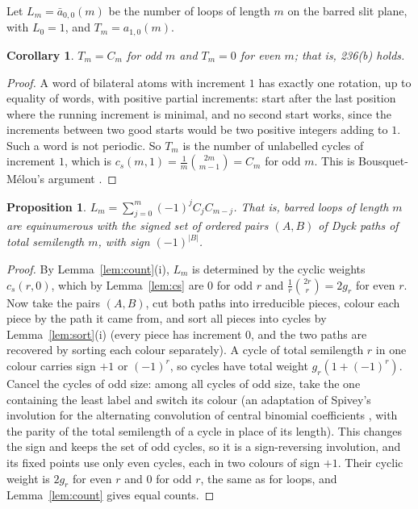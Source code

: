 \documentclass[11pt]{amsart}
\newtheorem{proposition}[theorem]{Proposition}
\newtheorem{corollary}[theorem]{Corollary}
\theoremstyle{definition}
\theoremstyle{remark}
\newcommand{\abar}{\bar a}
\begin{document}
Let $L_m=\abar_{0,0}(m)$ be the number of loops of length $m$ on the barred slit plane, with $L_0=1$, and $T_m=a_{1,0}(m)$.

\begin{corollary}\label{cor:T}
$T_m=C_m$ for odd $m$ and $T_m=0$ for even $m$; that is, 236(b) holds.
\end{corollary}

\begin{proof}
A word of bilateral atoms with increment $1$ has exactly one rotation, up to equality of words, with positive partial
increments: start after the last position where the running increment is minimal, and no second start works, since the
increments between two good starts would be two positive integers adding to $1$. Such a word is not periodic. So $T_m$
is the number of unlabelled cycles of increment $1$, which is $c_s(m,1)=\frac1m\binom{2m}{m-1}=C_m$ for odd $m$.
This is Bousquet-M\'elou's argument \cite[Prop.~2]{BM}.
\end{proof}

\begin{proposition}\label{prop:loops}
$L_m=\sum_{j=0}^m(-1)^jC_jC_{m-j}$. That is, barred loops of length $m$ are equinumerous with the signed set of
ordered pairs $(A,B)$ of Dyck paths of total semilength $m$, with sign $(-1)^{|B|}$.
\end{proposition}

\begin{proof}
By Lemma~\ref{lem:count}(i), $L_m$ is determined by the cyclic weights $c_s(r,0)$, which by Lemma~\ref{lem:cs} are
$0$ for odd $r$ and $\frac1r\binom{2r}r=2g_r$ for even $r$. Now take the pairs $(A,B)$, cut both paths into irreducible
pieces, colour each piece by the path it came from, and sort all pieces into cycles by Lemma~\ref{lem:sort}(i) (every
piece has increment $0$, and the two paths are recovered by sorting each colour separately). A cycle of total semilength
$r$ in one colour carries sign $+1$ or $(-1)^r$, so cycles have total weight $g_r(1+(-1)^r)$. Cancel the cycles of odd
size: among all cycles of odd size, take the one containing the least label and switch its colour (an adaptation of Spivey's involution for the alternating
convolution of central binomial coefficients \cite{Sp}, with the parity of the total semilength of a cycle in place of
its length). This changes the sign
and keeps the set of odd cycles, so it is a sign-reversing involution, and its fixed points use only even cycles, each in
two colours of sign $+1$. Their cyclic weight is $2g_r$ for even $r$ and $0$ for odd $r$, the same as for loops, and
Lemma~\ref{lem:count} gives equal counts.
\end{proof}
\end{document}
